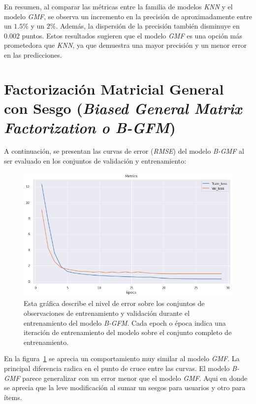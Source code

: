 \documentclass[11pt,a4paper,twoside]{thesis}
\begin{document}
En resumen, al comparar las métricas entre la familia de modelos \textit{KNN} y
el modelo \textit{GMF}, se observa un incremento en la precisión de
aproximadamente entre un $1.5\%$ y un $2\%$. Además, la dispersión de la
precisión también disminuye en $0.002$ puntos. Estos resultados sugieren que el
modelo \textit{GMF} es una opción más prometedora que \textit{KNN}, ya que
demuestra una mayor precisión y un menor error en las predicciones.

\clearpage

\section{Factorización Matricial General con Sesgo
  (\textit{Biased General Matrix Factorization o B-GFM})}

A continuación, se presentan las curvas de error (\textit{RMSE}) del modelo
\textit{B-GMF} al ser evaluado en los conjuntos de validación y entrenamiento:

\begin{figure}[h!]
	\centering
	\includegraphics[width=13cm]{./images/metrics-BGFM-train-val-loss.png}
	\caption{
		Esta gráfica describe el nivel de error sobre los conjuntos
		de observaciones de entrenamiento y validación durante el entrenamiento
		del modelo \textit{B-GFM}. Cada epoch o época indica una iteración de
		entrenamiento del modelo sobre el conjunto completo de entrenamiento.
	}
	\label{fig:bGMFLoss}
\end{figure}

En la figura~\ref{fig:bGMFLoss} se aprecia un comportamiento muy similar al
modelo \textit{GMF}. La principal diferencia radica en el punto de cruce entre
las curvas. El modelo \textit{B-GMF} parece generalizar con un error menor que
el modelo \textit{GMF}. Aqui en donde se aprecia que la leve modificación al
sumar un sesgos para usuarios y otro para ítems.
\end{document}

